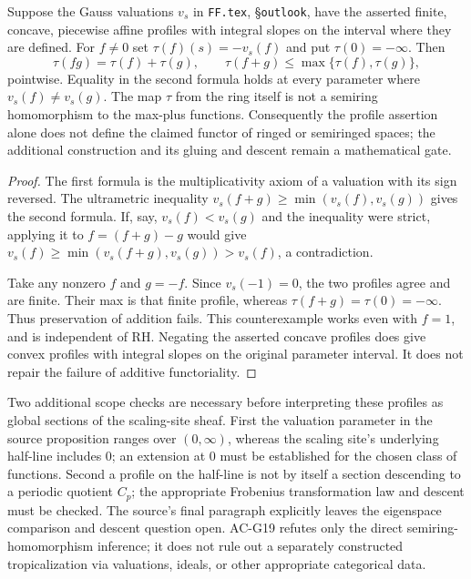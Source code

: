 \begin{proposition}
\label{AC-G19}
Suppose the Gauss valuations $v_s$ in \texttt{FF.tex},
\S\texttt{outlook}, have the asserted finite, concave, piecewise
affine profiles with integral slopes on the interval where they are
defined.  For $f\ne0$ set $\tau(f)(s)=-v_s(f)$ and put
$\tau(0)=-\infty$.  Then
\[
 \tau(fg)=\tau(f)+\tau(g),\qquad
 \tau(f+g)\leq\max\{\tau(f),\tau(g)\},
\]
pointwise.  Equality in the second formula holds at every parameter
where $v_s(f)\ne v_s(g)$.
The map $\tau$ from the ring itself is not a semiring homomorphism to
the max-plus functions.  Consequently the profile assertion alone
does not define the claimed functor of ringed or semiringed spaces;
the additional construction and its gluing and descent remain a
mathematical gate.
\end{proposition}
\begin{proof}
The first formula is the multiplicativity axiom of a valuation with
its sign reversed.  The ultrametric inequality
$v_s(f+g)\geq\min(v_s(f),v_s(g))$ gives the second formula.  If, say,
$v_s(f)<v_s(g)$ and the inequality were strict, applying it to
$f=(f+g)-g$ would give
$v_s(f)\geq\min(v_s(f+g),v_s(g))>v_s(f)$, a contradiction.

Take any nonzero $f$ and $g=-f$.  Since $v_s(-1)=0$, the two profiles
agree and are finite.  Their max is that finite profile, whereas
$\tau(f+g)=\tau(0)=-\infty$.  Thus preservation of addition fails.
This counterexample works even with $f=1$, and is independent of RH.
Negating the asserted concave profiles does give convex profiles with
integral slopes on the original parameter interval.  It does not
repair the failure of additive functoriality.
\end{proof}

\begin{remark}
Two additional scope checks are necessary before interpreting these
profiles as global sections of the scaling-site sheaf.  First the
valuation parameter in the source proposition ranges over
$(0,\infty)$, whereas the scaling site's underlying half-line
includes $0$; an extension at $0$ must be established for the chosen
class of functions.  Second a profile on the half-line is not by
itself a section descending to a periodic quotient $C_p$; the
appropriate Frobenius transformation law and descent must be checked.
The source's final paragraph explicitly leaves the eigenspace
comparison and descent question open.  AC-G19 refutes only the direct
semiring-homomorphism inference; it does not rule out a separately
constructed tropicalization via valuations, ideals, or other
appropriate categorical data.
\end{remark}

